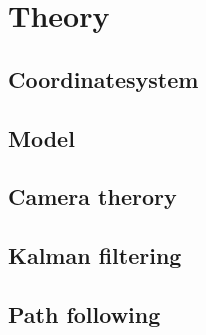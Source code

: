 \chapter[Theroy][Theory]{Theory}

\section{Coordinatesystem}



\section{Model}



\section{Camera therory}


\section{Kalman filtering}


\section{Path following}